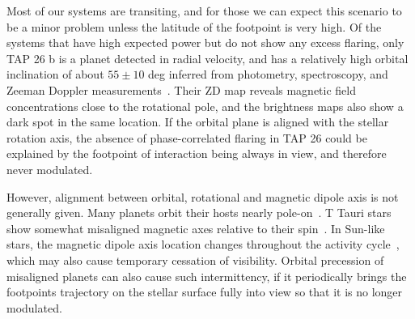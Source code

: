 \documentclass[twocolumn]{aastex631}
\begin{document}
Most of our systems are transiting, and for those we can expect this scenario to be a minor problem unless the latitude of the footpoint is very high. Of the systems that have high expected power but do not show any excess flaring, only TAP 26 b is a planet detected in radial velocity, and has a relatively high orbital inclination of about $55\pm10$ deg inferred from photometry, spectroscopy, and Zeeman Doppler measurements~\citep{yu2017hot}. Their ZD map reveals magnetic field concentrations close to the rotational pole, and the brightness maps also show a dark spot in the same location. If the orbital plane is aligned with the stellar rotation axis, the absence of phase-correlated flaring in TAP 26 could be explained by the footpoint of interaction being always in view, and therefore never modulated. 

However, alignment between orbital, rotational and magnetic dipole axis is not generally given. Many planets orbit their hosts nearly pole-on~\citep{albrecht2012obliquities, albrecht2022stellar, bourrier2023dream}. T Tauri stars show somewhat misaligned magnetic axes relative to their spin~\citep{mcginnis2020magnetic}. In Sun-like stars, the magnetic dipole axis location changes throughout the activity cycle~\citep{petit2009polarity,borosaikia2018direct}, which may also cause temporary cessation of visibility. Orbital precession of misaligned planets can also cause such intermittency, if it periodically brings the footpoints trajectory on the stellar surface fully into view so that it is no longer modulated. 




\end{document}
